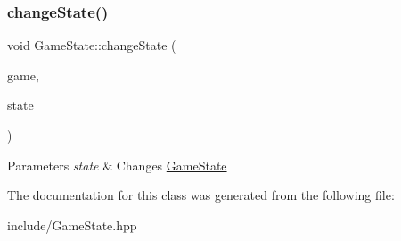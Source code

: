 \subsubsection{\texorpdfstring{changeState()}{changeState()}}
{\footnotesize\ttfamily void Game\+State\+::change\+State (\begin{DoxyParamCaption}\item[{\mbox{\hyperlink{class_game_engine}{Game\+Engine}} $\ast$}]{game,  }\item[{\mbox{\hyperlink{class_game_state}{Game\+State}} $\ast$}]{state }\end{DoxyParamCaption})\hspace{0.3cm}{\ttfamily [inline]}}


\begin{DoxyParams}{Parameters}
{\em state} & Changes \mbox{\hyperlink{class_game_state}{Game\+State}} \\
\hline
\end{DoxyParams}


The documentation for this class was generated from the following file\+:\begin{DoxyCompactItemize}
\item 
include/Game\+State.\+hpp\end{DoxyCompactItemize}

